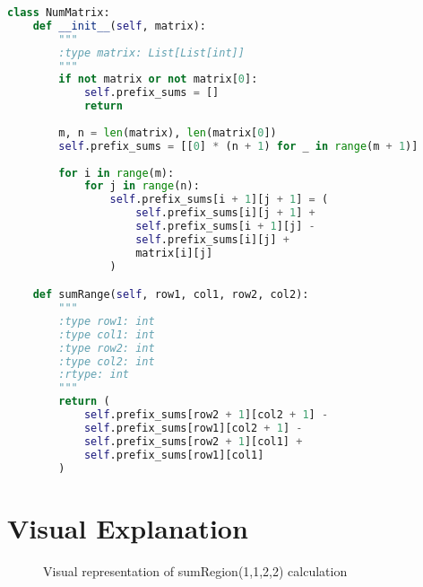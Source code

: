 \begin{fullwidth}
\begin{lstlisting}[language=Python]
class NumMatrix:
    def __init__(self, matrix):
        """
        :type matrix: List[List[int]]
        """
        if not matrix or not matrix[0]:
            self.prefix_sums = []
            return
        
        m, n = len(matrix), len(matrix[0])
        self.prefix_sums = [[0] * (n + 1) for _ in range(m + 1)]
        
        for i in range(m):
            for j in range(n):
                self.prefix_sums[i + 1][j + 1] = (
                    self.prefix_sums[i][j + 1] + 
                    self.prefix_sums[i + 1][j] - 
                    self.prefix_sums[i][j] + 
                    matrix[i][j]
                )

    def sumRange(self, row1, col1, row2, col2):
        """
        :type row1: int
        :type col1: int
        :type row2: int
        :type col2: int
        :rtype: int
        """
        return (
            self.prefix_sums[row2 + 1][col2 + 1] - 
            self.prefix_sums[row1][col2 + 1] - 
            self.prefix_sums[row2 + 1][col1] + 
            self.prefix_sums[row1][col1]
        )
\end{lstlisting}
\end{fullwidth}

\section*{Visual Explanation}
\begin{figure}[h]
    \centering
    \caption{Visual representation of sumRegion(1,1,2,2) calculation}
    \label{fig:prefix_sum_2d}
\end{figure}


